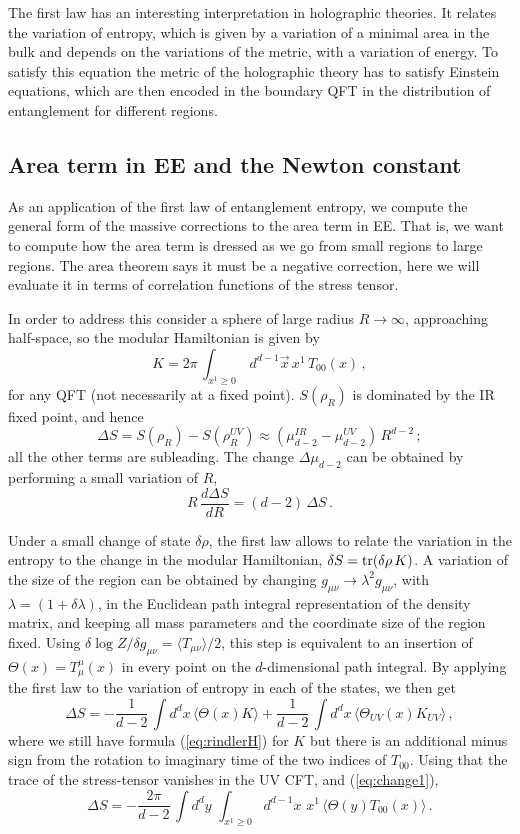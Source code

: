 \documentclass[11pt]{article}
\numberwithin{equation}{section}
\newcommand{\be}{\begin{equation}}
\newcommand{\ee}{\end{equation}}
\begin{document}
The first law has an interesting interpretation in holographic theories. It relates the variation of entropy, which is given by a variation of a minimal area in the bulk and depends on the variations of the metric, with a variation of energy. To satisfy this equation the metric of the holographic theory has to satisfy Einstein equations, which are then encoded in the boundary QFT in the distribution of entanglement for different regions.   

\subsection{Area term in EE and the Newton constant}

As an application of the first law of entanglement entropy, we compute the general form of the massive corrections to the area term in EE. That is, we want to compute how the area term is dressed as we go from small regions to large regions. The area theorem says it must be a negative correction, here we will evaluate it in terms of correlation functions of the stress tensor. 


In order to address this  consider a sphere of large radius $R\rightarrow \infty$, approaching  half-space, so the modular Hamiltonian is given by
\be\label{eq:rindlerH}
 K =2\pi\,\int_{x^1 \ge 0}\, d^{d-1}\vec x\,x^1\,T_{00}(x)\,,
\ee
for any QFT (not necessarily at a fixed point). $S(\rho_R)$ is dominated by the IR fixed point, and hence
\be
\Delta S = S(\rho_R)-S(\rho^{UV}_R) \approx ( \mu_{d-2}^{IR}- \mu_{d-2}^{UV})\,R^{d-2}\,;
\ee
all the other terms are subleading. The change $\Delta  \mu_{d-2}$ can be obtained by performing a small variation of $R$,
\be\label{eq:change1}
R\,\frac{d \Delta S}{dR}=(d-2)\,\Delta S\,.
\ee

Under a small change of state $\delta \rho$, the first law allows to relate the variation in the entropy to the change in the modular Hamiltonian, $\delta S =  {\rm tr}(\delta \rho\, K )$. 
 A variation of the size of the region can be obtained by changing $g_{\mu\nu}\rightarrow \lambda^2 g_{\mu\nu}$, with $\lambda=(1+\delta \lambda)$,  in the Euclidean path
integral representation of the density matrix, and keeping all mass parameters and the coordinate size of the region fixed. Using $\delta \log Z/\delta g_{\mu\nu}= \langle T_{\mu\nu}\rangle/2$, this step is equivalent to an insertion of $\Theta(x)=T_{\mu}^\mu(x)$ in every point on the $d$-dimensional path integral.
 By applying the first law to the variation of entropy in each of the states,   we then get
\be\label{eq:DeltaS1}
\Delta S = -\frac{1}{d-2}\,\int d^dx\,\langle \Theta(x) K \rangle+\frac{1}{d-2}\,\int d^dx\,\langle \Theta_{UV}(x) K_{UV} \rangle\,,
\ee
where we still have formula (\ref{eq:rindlerH}) for $K$ but there is an additional  minus sign from the rotation to imaginary time of the two indices of $T_{00}$. 
Using that the trace of the stress-tensor vanishes in the UV CFT, and (\ref{eq:change1}), 
\be\label{eq:DeltaS3}
\Delta S=-\frac{2\pi}{d-2}\,\int d^dy\,\,\int_{x^1\ge 0} d^{d-1}x\,\,x^1\,\langle \Theta(y) T_{00}(x) \rangle\,.
\ee
\end{document}
